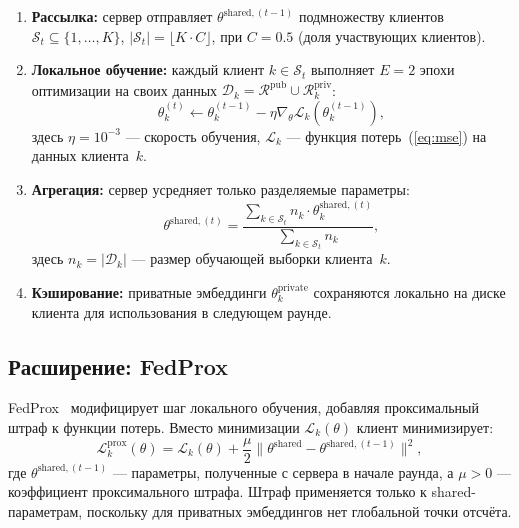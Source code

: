 \documentclass[14pt,a4paper]{extarticle}
\begin{document}
\begin{enumerate}
  \item \textbf{Рассылка:} сервер отправляет $\theta^{\text{shared},(t-1)}$ подмножеству клиентов $\mathcal{S}_t \subseteq \{1, \ldots, K\}$, $|\mathcal{S}_t| = \lfloor K \cdot C \rfloor$, при $C = 0.5$ (доля участвующих клиентов).

  \item \textbf{Локальное обучение:} каждый клиент $k \in \mathcal{S}_t$ выполняет $E = 2$ эпохи оптимизации на своих данных $\mathcal{D}_k = \mathcal{R}^{\text{pub}} \cup \mathcal{R}_k^{\text{priv}}$:
  \begin{equation}
    \theta_k^{(t)} \leftarrow \theta_k^{(t-1)} - \eta \nabla_\theta \mathcal{L}_k(\theta_k^{(t-1)}),
  \end{equation}
  здесь $\eta = 10^{-3}$ --- скорость обучения, $\mathcal{L}_k$ --- функция потерь~(\ref{eq:mse}) на данных клиента~$k$.

  \item \textbf{Агрегация:} сервер усредняет только разделяемые параметры:
  \begin{equation}
    \theta^{\text{shared},(t)} = \frac{\sum_{k \in \mathcal{S}_t} n_k \cdot \theta_k^{\text{shared},(t)}}{\sum_{k \in \mathcal{S}_t} n_k},
    \label{eq:fedavg}
  \end{equation}
  здесь $n_k = |\mathcal{D}_k|$ --- размер обучающей выборки клиента~$k$.

  \item \textbf{Кэширование:} приватные эмбеддинги $\theta^{\text{private}}_k$ сохраняются локально на диске клиента для использования в следующем раунде.
\end{enumerate}


\subsection{Расширение: FedProx}

FedProx~\cite{li2020federated} модифицирует шаг локального обучения, добавляя проксимальный штраф к функции потерь. Вместо минимизации $\mathcal{L}_k(\theta)$ клиент минимизирует:
\begin{equation}
\mathcal{L}_k^{\text{prox}}(\theta) = \mathcal{L}_k(\theta) + \frac{\mu}{2}\|\theta^{\text{shared}} - \theta^{\text{shared},(t-1)}\|^2,
\label{eq:fedprox}
\end{equation}
где $\theta^{\text{shared},(t-1)}$ --- параметры, полученные с сервера в начале раунда, а $\mu > 0$ --- коэффициент проксимального штрафа. Штраф применяется только к shared-параметрам, поскольку для приватных эмбеддингов нет глобальной точки отсчёта.
\end{document}
